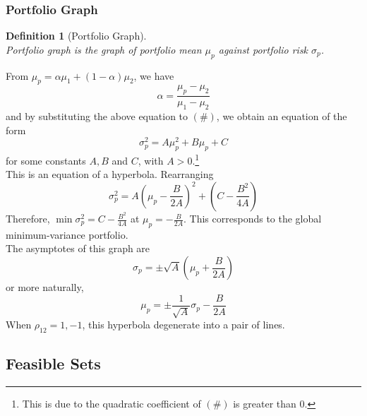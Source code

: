 \documentclass[12pt]{article}
\newtheorem{definition}{Definition}[section]
\theoremstyle{definition}
\begin{document}
\subsubsection{Portfolio Graph}
\begin{definition}[Portfolio Graph]
\hfill\\\normalfont Portfolio graph is the graph of portfolio mean $\mu_p$ against portfolio risk $\sigma_p$.\end{definition}
From $\mu_p = \alpha\mu_1+(1-\alpha)\mu_2$, we have
\[
\alpha = \frac{\mu_p-\mu_2}{\mu_1-\mu_2}
\]
and by substituting the above equation to $(\#)$, we obtain an equation of the form
\[
\sigma_p^2 = A\mu_p^2+B\mu_p+C
\]
for some constants $A,B$ and $C$, with $A>0$.\footnote{This is due to the quadratic coefficient of $(\#)$ is greater than 0.}\\
This is an equation of a hyperbola. Rearranging
\[
\sigma_p^2 = A(\mu_p-\frac{B}{2A})^2+(C-\frac{B^2}{4A})
\]
Therefore, $\min\sigma_p^2 = C-\frac{B^2}{4A}$ at $\mu_p = -\frac{B}{2A}$. This corresponds to the global minimum-variance portfolio.\\The asymptotes of this graph are
\[
\sigma_p = \pm \sqrt{A}(\mu_p+\frac{B}{2A})
\]
or more naturally,
\[
\mu_p = \pm\frac{1}{\sqrt{A}}\sigma_p -\frac{B}{2A}
\]
When $\rho_{12}=1,-1$, this hyperbola degenerate into a pair of lines.
\subsection{Feasible Sets}
\end{document}
